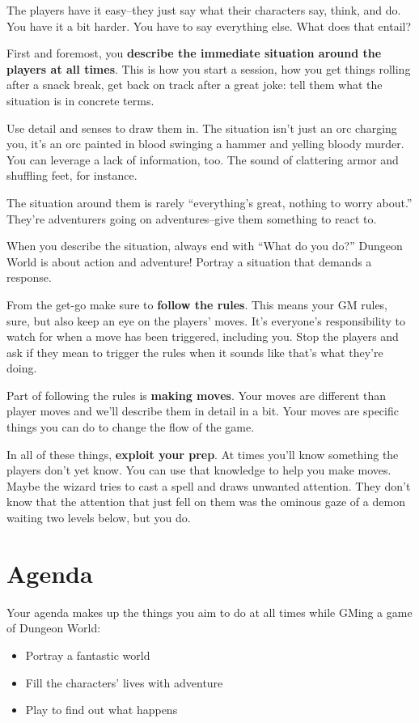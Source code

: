 The players have it easy--they just say what their characters say, think, and do. You have it a bit harder. You have to say everything else. What does that entail?

First and foremost, you \textbf{describe the immediate situation around the players at all times}. This is how you start a session, how you get things rolling after a snack break, get back on track after a great joke: tell them what the situation is in concrete terms.

Use detail and senses to draw them in. The situation isn't just an orc charging you, it's an orc painted in blood swinging a hammer and yelling bloody murder. You can leverage a lack of information, too. The sound of clattering armor and shuffling feet, for instance.

The situation around them is rarely ``everything's great, nothing to worry about.'' They're adventurers going on adventures--give them something to react to.

When you describe the situation, always end with ``What do you do?'' Dungeon World is about action and adventure! Portray a situation that demands a response.

From the get-go make sure to \textbf{follow the rules}. This means your GM rules, sure, but also keep an eye on the players' moves. It's everyone's responsibility to watch for when a move has been triggered, including you. Stop the players and ask if they mean to trigger the rules when it sounds like that's what they're doing.

Part of following the rules is \textbf{making moves}. Your moves are different than player moves and we'll describe them in detail in a bit. Your moves are specific things you can do to change the flow of the game.

In all of these things, \textbf{exploit your prep}. At times you'll know something the players don't yet know. You can use that knowledge to help you make moves. Maybe the wizard tries to cast a spell and draws unwanted attention. They don't know that the attention that just fell on them was the ominous gaze of a demon waiting two levels below, but you do. 
\section*{Agenda}

Your agenda makes up the things you aim to do at all times while GMing a game of Dungeon World:
\begin{itemize}
\item Portray a fantastic world
\item Fill the characters' lives with adventure
\item Play to find out what happens

\end{itemize}

